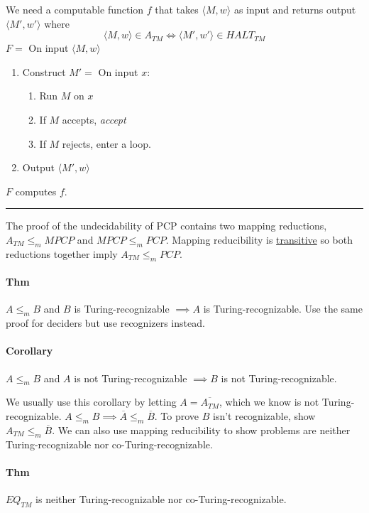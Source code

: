 \documentclass[12 pt]{article}
\begin{document}
We need a computable function $f$ that takes $\langle M,w \rangle$ as
input and returns output $\langle M',w' \rangle$ where
$$\langle M,w \rangle \in A_{TM} \iff \langle M',w' \rangle \in
HALT_{TM}$$
$F = $ On input $\langle M,w \rangle$
\begin{enumerate}
\item Construct $M' =$ On input $x$:
  \begin{enumerate}
  \item Run $M$ on $x$
  \item If $M$ accepts, \textit{accept}
  \item If $M$ rejects, enter a loop.
  \end{enumerate}
\item Output $\langle M',w \rangle$
\end{enumerate}
$F$ computes $f$.
\\ \noindent \rule{\textwidth}{0.5pt}
The proof of the undecidability of PCP contains two mapping
reductions, $A_{TM} \leq_m MPCP$ and $MPCP \leq_m PCP$. Mapping
reducibility is \underline{transitive} so both reductions together
imply $A_{TM} \leq_m PCP$.
\paragraph{Thm}
$A \leq_m B$ and $B$ is Turing-recognizable $\implies A$ is
Turing-recognizable. Use the same proof for deciders but use
recognizers instead.
\paragraph{Corollary}
$A \leq_m B$ and $A$ is not Turing-recognizable $\implies B$ is not
Turing-recognizable.

We usually use this corollary by letting $A = \overline{A_{TM}}$,
which we know is not Turing-recognizable. $A \leq_m B \implies
\overline{A}\leq_m \overline{B}$. To prove $B$ isn't recognizable,
show $A_{TM} \leq_m \overline{B}$. We can also use mapping
reducibility to show problems are neither Turing-recognizable nor
co-Turing-recognizable.
\paragraph{Thm}
$EQ_{TM}$ is neither Turing-recognizable nor co-Turing-recognizable.
\end{document}
